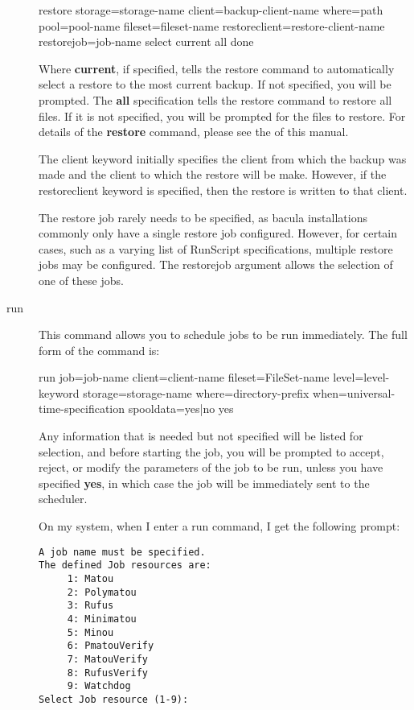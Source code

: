 \begin{description}
restore storage=\lt{}storage-name\gt{} client=\lt{}backup-client-name\gt{} 
  where=\lt{}path\gt{} pool=\lt{}pool-name\gt{} fileset=\lt{}fileset-name\gt{} 
  restoreclient=\lt{}restore-client-name\gt{}
  restorejob=\lt{}job-name\gt{}
  select current all done  

   Where {\bf current}, if specified, tells the restore command to
   automatically select a restore to the most current backup.  If not
   specified, you will be prompted.  The {\bf all} specification tells the
   restore command to restore all files.  If it is not specified, you will
   be prompted for the files to restore.  For details of the {\bf restore}
   command, please see the  of this
   manual.

   The client keyword initially specifies the client from which the backup
   was made and the client to which the restore will be make.  However,
   if the restoreclient keyword is specified, then the restore is written
   to that client.

   The restore job rarely needs to be specified, as bacula installations
   commonly only have a single restore job configured. However, for certain
   cases, such as a varying list of RunScript specifications, multiple
   restore jobs may be configured. The restorejob argument allows the
   selection of one of these jobs.

\item [run]
   This command allows you to schedule jobs  to be run immediately. The full form
   of the command is:

run job=\lt{}job-name\gt{} client=\lt{}client-name\gt{}
  fileset=\lt{}FileSet-name\gt{}  level=\lt{}level-keyword\gt{}
  storage=\lt{}storage-name\gt{}  where=\lt{}directory-prefix\gt{}
  when=\lt{}universal-time-specification\gt{} spooldata=yes|no yes

   Any information that is needed but not specified will be listed for
   selection, and before starting the job, you will be prompted to accept,
   reject, or modify the parameters of the job to be run, unless you have
   specified {\bf yes}, in which case the job will be immediately sent to
   the scheduler.

   On my system, when I enter a run command, I get the following  prompt:  

\footnotesize
\begin{verbatim}
A job name must be specified.
The defined Job resources are:
     1: Matou
     2: Polymatou
     3: Rufus
     4: Minimatou
     5: Minou
     6: PmatouVerify
     7: MatouVerify
     8: RufusVerify
     9: Watchdog
Select Job resource (1-9):
     

\end{verbatim}
\end{description}
